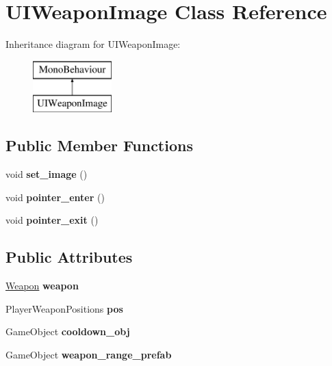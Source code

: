 \hypertarget{class_u_i_weapon_image}{}\section{U\+I\+Weapon\+Image Class Reference}
\label{class_u_i_weapon_image}
Inheritance diagram for U\+I\+Weapon\+Image\+:\begin{figure}[H]
\begin{center}
\leavevmode
\includegraphics[height=2.000000cm]{class_u_i_weapon_image}
\end{center}
\end{figure}
\subsection*{Public Member Functions}
\begin{DoxyCompactItemize}
\item 
\mbox{\label{class_u_i_weapon_image_aa7097cf3e10e83cd0325a7b3e51555e0}} 
void {\bfseries set\+\_\+image} ()
\item 
\mbox{\label{class_u_i_weapon_image_abd818a27a4ba74c531c62357f7e57405}} 
void {\bfseries pointer\+\_\+enter} ()
\item 
\mbox{\label{class_u_i_weapon_image_af33c9101ca3bc3ed2c624dba50043735}} 
void {\bfseries pointer\+\_\+exit} ()
\end{DoxyCompactItemize}
\subsection*{Public Attributes}
\begin{DoxyCompactItemize}
\item 
\mbox{\label{class_u_i_weapon_image_a0ed18276d1730b0d3c667b4c81119ab6}} 
\hyperlink{class_weapon}{Weapon} {\bfseries weapon}
\item 
\mbox{\label{class_u_i_weapon_image_aed9f56b16d2b887c6b6d231b03bcf222}} 
Player\+Weapon\+Positions {\bfseries pos}
\item 
\mbox{\label{class_u_i_weapon_image_acb96cea426cb30e9821ae13ea71f6cde}} 
Game\+Object {\bfseries cooldown\+\_\+obj}
\item 
\mbox{\label{class_u_i_weapon_image_a5f4c869a156443a275506592f0a4cca1}} 
Game\+Object {\bfseries weapon\+\_\+range\+\_\+prefab}
\end{DoxyCompactItemize}
